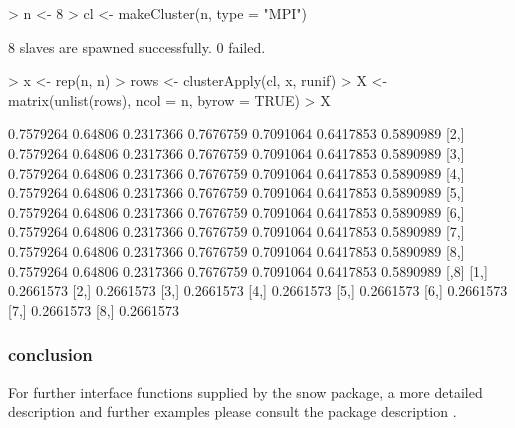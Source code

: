 \begin{Schunk}
\begin{Sinput}
> n <- 8
> cl <- makeCluster(n, type = "MPI")
\end{Sinput}
\begin{Soutput}
	8 slaves are spawned successfully. 0 failed.
\end{Soutput}
\begin{Sinput}
> x <- rep(n, n)
> rows <- clusterApply(cl, x, runif)
> X <- matrix(unlist(rows), ncol = n, byrow = TRUE)
> X
\end{Sinput}
\begin{Soutput}
          [,1]    [,2]      [,3]      [,4]      [,5]      [,6]      [,7]
[1,] 0.7579264 0.64806 0.2317366 0.7676759 0.7091064 0.6417853 0.5890989
[2,] 0.7579264 0.64806 0.2317366 0.7676759 0.7091064 0.6417853 0.5890989
[3,] 0.7579264 0.64806 0.2317366 0.7676759 0.7091064 0.6417853 0.5890989
[4,] 0.7579264 0.64806 0.2317366 0.7676759 0.7091064 0.6417853 0.5890989
[5,] 0.7579264 0.64806 0.2317366 0.7676759 0.7091064 0.6417853 0.5890989
[6,] 0.7579264 0.64806 0.2317366 0.7676759 0.7091064 0.6417853 0.5890989
[7,] 0.7579264 0.64806 0.2317366 0.7676759 0.7091064 0.6417853 0.5890989
[8,] 0.7579264 0.64806 0.2317366 0.7676759 0.7091064 0.6417853 0.5890989
          [,8]
[1,] 0.2661573
[2,] 0.2661573
[3,] 0.2661573
[4,] 0.2661573
[5,] 0.2661573
[6,] 0.2661573
[7,] 0.2661573
[8,] 0.2661573
\end{Soutput}
\end{Schunk}



\subsubsection{conclusion}


For further interface functions supplied by the snow package, a more detailed
description and further examples please consult the package description
\cite{tierney07snow}.

